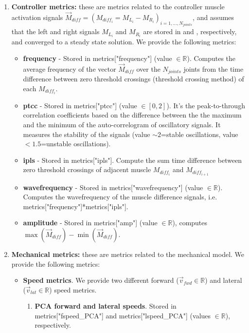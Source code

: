 \documentclass{cmc}
\begin{document}
\begin{enumerate}
\item \textbf{Controller metrics:} these are metrics related to the controller muscle activation signals $\overrightarrow{M}_{diff}=(M_{diff_i}=M_{L_i} - M_{R_i})_{i=1,...,N_{joints}}$, and assumes that the left and right signals $M_{L_i}$ and $M_{R_i}$ are stored in  and , respectively, and converged to a steady state solution. We provide the following metrics:
	\begin{itemize}
	\item \textbf{frequency} - Stored in metrics["frequency"] (value $\in \mathbb{R}$). Computes the average frequency of the vector $\overrightarrow{M}_{diff}$ over the $N_{joints}$ joints from the time difference between zero threshold crossings (threshold crossing method) of each $M_{diff_i}$.
	\item \textbf{ptcc} - Stored in metrics["ptcc"] (value $\in [0,2]$). It's the peak-to-through correlation coefficients based on the difference between the the maximum and the minimum of the auto-correlogram of oscillatory signals. It measures the stability of the signals (value $\sim 2$=stable oscillations, value $<1.5$=unstable oscillations). 	
	\item \textbf{ipls} - Stored in metrics["ipls"]. Compute the sum time difference between zero threshold crossings of adjacent muscle $M_{diff_i}$ and $M_{diff_{i+1}}$
	\item \textbf{wavefrequency} - Stored in metrics["wavefrequency"] (value $\in \mathbb{R}$). Computes the wavefrequency of the muscle difference signals, i.e. metrics["frequency"]*metrics["ipls"].
		\item \textbf{amplitude} - Stored in metrics["amp"] (value $\in \mathbb{R}$), computes $\max(\overrightarrow{M}_{diff})-\min(\overrightarrow{M}_{diff})$.
	\end{itemize}
\item \textbf{Mechanical metrics:} these are metrics related to the mechanical model. We provide the following metrics:
	\begin{itemize}
	\item \textbf{Speed metrics}. We provide two different forward ($\vec{v}_{fwd} \in \mathbb{R}$) and lateral ($\vec{v}_{lat} \in \mathbb{R}$) speed metrics.
	\begin{enumerate}
	\item \textbf{PCA forward and lateral speeds}. Stored in metrics["fspeed\_PCA"] and metrics["lspeed\_PCA"] (values $\in \mathbb{R}$), respectively. \newline

\end{enumerate}
\end{itemize}
\end{enumerate}
\end{document}
